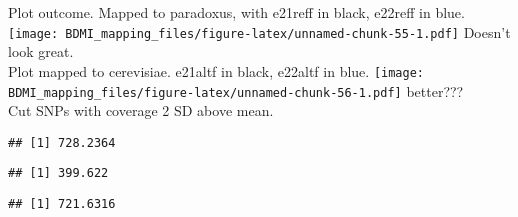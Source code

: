 \documentclass[
]{article}
\newenvironment{Shaded}{\begin{snugshade}}{\end{snugshade}}
\newcommand{\DecValTok}[1]{\textcolor[rgb]{0.00,0.00,0.81}{#1}}
\newcommand{\FunctionTok}[1]{\textcolor[rgb]{0.13,0.29,0.53}{\textbf{#1}}}
\newcommand{\NormalTok}[1]{#1}
\newcommand{\OtherTok}[1]{\textcolor[rgb]{0.56,0.35,0.01}{#1}}
\newcommand{\SpecialCharTok}[1]{\textcolor[rgb]{0.81,0.36,0.00}{\textbf{#1}}}
\begin{document}
Plot outcome. Mapped to paradoxus, with e21reff in black, e22reff in
blue.
\texttt{[image: BDMI\_mapping\_files/figure-latex/unnamed-chunk-55-1.pdf]}
Doesn't look great.\\

Plot mapped to cerevisiae. e21altf in black, e22altf in blue.
\texttt{[image: BDMI\_mapping\_files/figure-latex/unnamed-chunk-56-1.pdf]}
better???\\

Cut SNPs with coverage 2 SD above mean.\\

\begin{Shaded}
\end{Shaded}

\begin{verbatim}
## [1] 728.2364
\end{verbatim}

\begin{Shaded}
\end{Shaded}

\begin{verbatim}
## [1] 399.622
\end{verbatim}

\begin{Shaded}
\end{Shaded}

\begin{verbatim}
## [1] 721.6316
\end{verbatim}

\begin{Shaded}
\end{Shaded}
\end{document}
